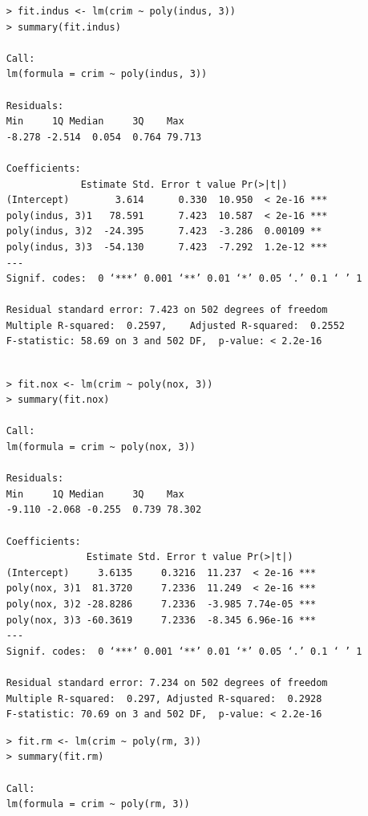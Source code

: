 \documentclass{article}
\begin{document}
\begin{itemize}
\begin{program}
	\begin{verbatim}
	> fit.indus <- lm(crim ~ poly(indus, 3))
	> summary(fit.indus)
	
	Call:
	lm(formula = crim ~ poly(indus, 3))
	
	Residuals:
	Min     1Q Median     3Q    Max 
	-8.278 -2.514  0.054  0.764 79.713 
	
	Coefficients:
	             Estimate Std. Error t value Pr(>|t|)    
	(Intercept)        3.614      0.330  10.950  < 2e-16 ***
	poly(indus, 3)1   78.591      7.423  10.587  < 2e-16 ***
	poly(indus, 3)2  -24.395      7.423  -3.286  0.00109 ** 
	poly(indus, 3)3  -54.130      7.423  -7.292  1.2e-12 ***
	---
	Signif. codes:  0 ‘***’ 0.001 ‘**’ 0.01 ‘*’ 0.05 ‘.’ 0.1 ‘ ’ 1
	
	Residual standard error: 7.423 on 502 degrees of freedom
	Multiple R-squared:  0.2597,	Adjusted R-squared:  0.2552 
	F-statistic: 58.69 on 3 and 502 DF,  p-value: < 2.2e-16
	
	\end{verbatim}
\end{program}


\begin{program}
	\begin{verbatim}
	> fit.nox <- lm(crim ~ poly(nox, 3))
	> summary(fit.nox)
	
	Call:
	lm(formula = crim ~ poly(nox, 3))
	
	Residuals:
	Min     1Q Median     3Q    Max 
	-9.110 -2.068 -0.255  0.739 78.302 
	
	Coefficients:
	              Estimate Std. Error t value Pr(>|t|)    
	(Intercept)     3.6135     0.3216  11.237  < 2e-16 ***
	poly(nox, 3)1  81.3720     7.2336  11.249  < 2e-16 ***
	poly(nox, 3)2 -28.8286     7.2336  -3.985 7.74e-05 ***
	poly(nox, 3)3 -60.3619     7.2336  -8.345 6.96e-16 ***
	---
	Signif. codes:  0 ‘***’ 0.001 ‘**’ 0.01 ‘*’ 0.05 ‘.’ 0.1 ‘ ’ 1
	
	Residual standard error: 7.234 on 502 degrees of freedom
	Multiple R-squared:  0.297,	Adjusted R-squared:  0.2928 
	F-statistic: 70.69 on 3 and 502 DF,  p-value: < 2.2e-16
	\end{verbatim}
\end{program}


\begin{program}
	\begin{verbatim}
	> fit.rm <- lm(crim ~ poly(rm, 3))
	> summary(fit.rm)
	
	Call:
	lm(formula = crim ~ poly(rm, 3))
	

\end{verbatim}
\end{program}
\end{itemize}
\end{document}
